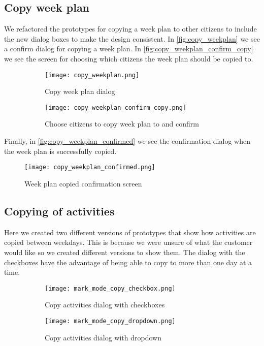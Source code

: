 \subsection{Copy week plan}
We refactored the prototypes for copying a week plan to other citizens to include the new dialog boxes to make the design consistent. In \autoref{fig:copy_weekplan} we see a confirm dialog for copying a week plan. In \autoref{fig:copy_weekplan_confirm_copy} we see the screen for choosing which citizens the week plan should be copied to. 
\begin{figure}[H]
    \begin{subfigure}{0.5\textwidth}
    \texttt{[image: copy\_weekplan.png]} 
    \caption{Copy week plan dialog}
    \label{fig:copy_weekplan}
    \end{subfigure}
    \begin{subfigure}{0.5\textwidth}
        \texttt{[image: copy\_weekplan\_confirm\_copy.png]}
    \caption{Choose citizens to copy week plan to and confirm}
    \label{fig:copy_weekplan_confirm_copy}
    \end{subfigure} 
    \caption{}
    \label{fig:copy_weekplan_confirm_copy_and_copy_weekplan}
\end{figure}
\noindent
Finally, in \autoref{fig:copy_weekplan_confirmed} we see the confirmation dialog when the week plan is successfully copied.

\begin{figure}
    \centering
    \texttt{[image: copy\_weekplan\_confirmed.png]} 
    \caption{Week plan copied confirmation screen}
    \label{fig:copy_weekplan_confirmed}
\end{figure}

\subsection{Copying of activities}
Here we created two different versions of prototypes that show how activities are copied between weekdays. This is because we were unsure of what the customer would like so we created different versions to show them. The dialog with the checkboxes have the advantage of being able to copy to more than one day at a time.
\begin{figure}[H]
    \begin{subfigure}{0.5\textwidth}
    \texttt{[image: mark\_mode\_copy\_checkbox.png]} 
    \caption{Copy activities dialog with checkboxes}
    \label{fig:mark_mode_copy_checkbox}
    \end{subfigure}
    \begin{subfigure}{0.5\textwidth}
        \texttt{[image: mark\_mode\_copy\_dropdown.png]}
    \caption{Copy activities dialog with dropdown}
    \label{fig:mark_mode_copy_dropdown}
    \end{subfigure} 
    \caption{}
    \label{fig:mark_mode_copy_dropdown_and_checkbox}
\end{figure}



